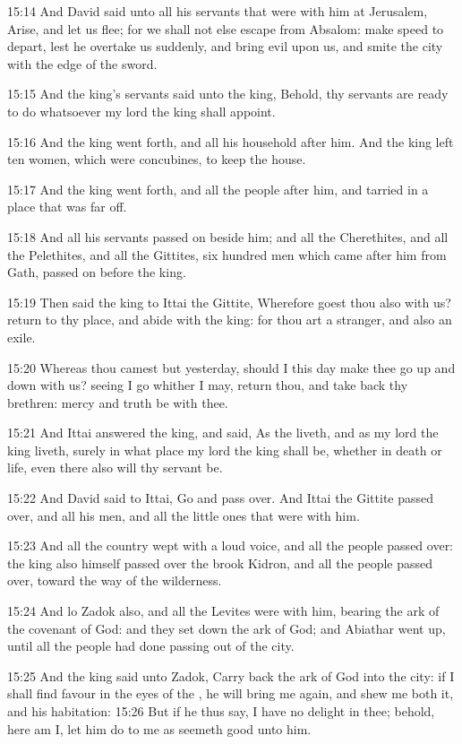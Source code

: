 15:14 And David said unto all his servants that were with him at
Jerusalem, Arise, and let us flee; for we shall not else escape from
Absalom: make speed to depart, lest he overtake us suddenly, and bring
evil upon us, and smite the city with the edge of the sword.

15:15 And the king's servants said unto the king, Behold, thy servants
are ready to do whatsoever my lord the king shall appoint.

15:16 And the king went forth, and all his household after him. And
the king left ten women, which were concubines, to keep the house.

15:17 And the king went forth, and all the people after him, and
tarried in a place that was far off.

15:18 And all his servants passed on beside him; and all the
Cherethites, and all the Pelethites, and all the Gittites, six hundred
men which came after him from Gath, passed on before the king.

15:19 Then said the king to Ittai the Gittite, Wherefore goest thou
also with us? return to thy place, and abide with the king: for thou
art a stranger, and also an exile.

15:20 Whereas thou camest but yesterday, should I this day make thee
go up and down with us? seeing I go whither I may, return thou, and
take back thy brethren: mercy and truth be with thee.

15:21 And Ittai answered the king, and said, As the \LORD liveth, and
as my lord the king liveth, surely in what place my lord the king
shall be, whether in death or life, even there also will thy servant
be.

15:22 And David said to Ittai, Go and pass over. And Ittai the Gittite
passed over, and all his men, and all the little ones that were with
him.

15:23 And all the country wept with a loud voice, and all the people
passed over: the king also himself passed over the brook Kidron, and
all the people passed over, toward the way of the wilderness.

15:24 And lo Zadok also, and all the Levites were with him, bearing
the ark of the covenant of God: and they set down the ark of God; and
Abiathar went up, until all the people had done passing out of the
city.

15:25 And the king said unto Zadok, Carry back the ark of God into the
city: if I shall find favour in the eyes of the \LORD, he will bring me
again, and shew me both it, and his habitation: 15:26 But if he thus
say, I have no delight in thee; behold, here am I, let him do to me as
seemeth good unto him.

